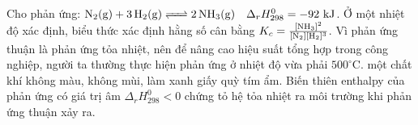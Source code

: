 \documentclass[11pt,a4paper]{article}
\begin{document}
\begin{ex}
Cho phản ứng: $\ce{N2(g) + 3H2(g) <=> 2NH3(g)} \quad \Delta_r H^0_{298} = -92\text{ kJ}$.
\choiceTF
\True Ở một nhiệt độ xác định, biểu thức xác định hằng số cân bằng $K_c = \frac{[\ce{NH3}]^2}{[\ce{N2}][\ce{H2}]^3}$.
Vì phản ứng thuận là phản ứng tỏa nhiệt, nên để nâng cao hiệu suất tổng hợp  trong công nghiệp, người ta thường thực hiện phản ứng ở nhiệt độ vừa phải $500^\circ\text{C}$.
 một chất khí không màu, không mùi, làm xanh giấy quỳ tím ẩm.
\True Biến thiên enthalpy của phản ứng có giá trị âm $\Delta_r H^0_{298} < 0$ chứng tỏ hệ tỏa nhiệt ra môi trường khi phản ứng thuận xảy ra.
\end{ex}
\end{document}
